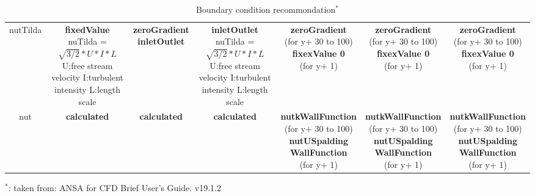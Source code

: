 \documentclass{article}
\begin{document}
\begin{landscape}
\begin{table}[h!]
\begin{tabular}{ccccccc}
nutTilda &	\makecell{\textbf{fixedValue} \\ nuTilda = $\sqrt{3/2}*U*I*L$ \\ U:free stream velocity \\ I:turbulent intensity \\L:length scale} &	\makecell{\textbf{zeroGradient} \\ \textbf{inletOutlet}} & \makecell{\textbf{inletOutlet} \\ nuTilda = $\sqrt{3/2}*U*I*L$ \\ U:free stream velocity \\ I:turbulent intensity \\L:length scale}	 & \makecell{\textbf{zeroGradient} \\ (for y+ 30 to 100) \\ \textbf{fixexValue 0} \\ (for y+ 1)} & 	\makecell{\textbf{zeroGradient} \\ (for y+ 30 to 100) \\ \textbf{fixexValue 0} \\ (for y+ 1)} & \makecell{\textbf{zeroGradient} \\ (for y+ 30 to 100) \\ \textbf{fixexValue 0} \\ (for y+ 1)}  \\

nut & \textbf{calculated} &	\textbf{calculated} & \textbf{calculated}  &	\makecell{\textbf{nutkWallFunction} \\ (for y+ 30 to 100) \\ \textbf{nutUSpalding}\\\textbf{WallFunction} \\ (for y+ 1)} & \makecell{\textbf{nutkWallFunction} \\ (for y+ 30 to 100) \\ \textbf{nutUSpalding}\\\textbf{WallFunction} \\ (for y+ 1)} & \makecell{\textbf{nutkWallFunction} \\ (for y+ 30 to 100) \\ \textbf{nutUSpalding}\\\textbf{WallFunction} \\ (for y+ 1)}\\
\end{tabular}
    \caption{Boundary condition recommondation$^*$}
    \label{tab:ANSA recomm}
\end{table}
$^*$: taken from: 
ANSA for CFD Brief User's Guide. v19.1.2

\end{landscape}
\restoregeometry
\end{document}
